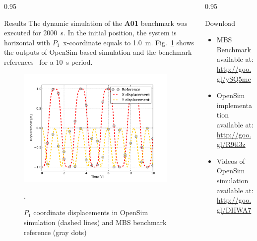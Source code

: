 \documentclass[final]{beamer}
\newlength{\onecolwid}
\newlength{\twocolwid}
\begin{document}
\begin{frame}[t]
\begin{columns}[t]
\begin{column}{\twocolwid}
\begin{columns}[t, totalwidth=\twocolwid]
\begin{column}{0.95\onecolwid}
\begin{block}{Results}
The dynamic simulation of the \textbf{A01} benchmark was executed for \SI{2000}{\second}.
In the initial position, the system is horizontal with $P_1$~\mbox{x-coordinate} equals to \SI{1.0}{\meter}.
Fig.~\ref{FIG:simulationPlot} shows the outputs of OpenSim-based simulation and the benchmark references~\cite{gonzalez2006benchmarking} for a \SI{10}{\second} period.


\begin{figure}[h]
\centering
\includegraphics[width=0.95\textwidth]{1MBS_resultsPlot.pdf}
\caption{$P_1$ coordinate displacements in OpenSim simulation (dashed lines) and MBS benchmark reference (gray dots)}. 
\label{FIG:simulationPlot}
\end{figure}

\end{block}

\end{column}
\end{columns}
\end{column}


\begin{column}{0.95\onecolwid} %
\begin{block}{Download}
\begin{itemize}
\item MBS Benchmark available at: \url{http://goo.gl/ySQ5me}
\item OpenSim implementation available at: \url{http://goo.gl/R9tl3z}
\item Videos of OpenSim simulation available at: \url{http://goo.gl/DIIWA7}
\end{itemize}
\end{block}


\end{column}
\end{columns}
\end{frame}
\end{document}
